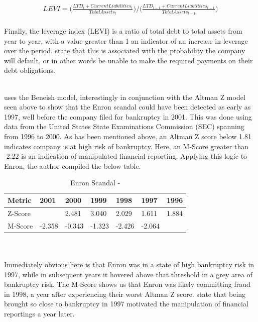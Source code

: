 {\begin{equation}\label{MScore-LEVI}
\begin{aligned}
LEVI = \bigg(\frac{LTD_t + Current Liabilities_t }{Total Assets_t} \bigg) /  \bigg(\frac{LTD_{t-1} + Current Liabilities_{t-1} }{Total Assets_{t-1}} \bigg)
\end{aligned}
\end{equation}\\
Finally, the leverage index (LEVI) is a ratio of total debt to total assets from year to year, with a value greater than 1 an indicator of an increase in leverage over the period. \cite{beneishOG} state that this is associated with the probability the company will default, or in other words be unable to make the required payments on their debt obligations. }\\\\
{\cite{mahamaCorpFraud} uses the Beneish model, interestingly in conjunction with the Altman Z model seen above to show that the Enron scandal could have been detected as early as 1997, well before the company filed for bankruptcy in 2001. This was done using data from the United States State Examinations Commission (SEC) spanning from 1996 to 2000. As has been mentioned above, an Altman Z score below 1.81 indicates company is at high risk of bankruptcy. Here, an M-Score greater than -2.22 is an indication of manipulated financial reporting. Applying this logic to Enron, the author compiled the below table. \\
\begin{table}[h!]
\centering
\begin{tabular}{ |p{2cm}||p{1.2cm}|p{1.2cm}|p{1.2cm}|p{1.2cm}|p{1.2cm}|p{1.2cm}|  }
 \hline
 Metric & 2001 & 2000 & 1999 & 1998 & 1997 & 1996\\
 \hline
 Z-Score &  & 2.481  & 3.040 & 2.029 & 1.611 & 1.884  \\
 M-Score & -2.358  & -0.343 & -1.323 & -2.426 & -2.064 &  \\
 \hline
\end{tabular}
\caption{Enron Scandal - \cite{mahamaCorpFraud}}
\end{table}\\\\
Immediately obvious here is that Enron was in a state of high bankruptcy risk in 1997, while in subsequent years it hovered above that threshold in a grey area of bankruptcy risk. The M-Score shows us that Enron was likely committing fraud in 1998, a year after experiencing their worst Altman Z score. \cite{mahamaCorpFraud} state that being brought so close to bankruptcy in 1997 motivated the manipulation of financial reportings a year later.}\\\\
